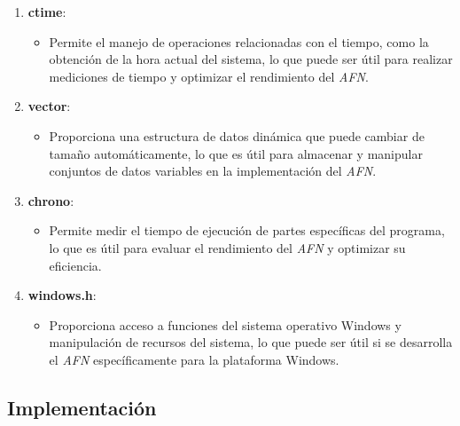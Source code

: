 \documentclass{article}
\begin{document}
\begin{enumerate}
            \item \textbf{ctime}:
            \begin{itemize}
                \item Permite el manejo de operaciones relacionadas con el tiempo, como la obtención de la hora actual del sistema,
                lo que puede ser útil para realizar mediciones de tiempo y optimizar el rendimiento del \textit{AFN}.
            \end{itemize}

            \item \textbf{vector}:
            \begin{itemize}
                \item Proporciona una estructura de datos dinámica que puede cambiar de tamaño automáticamente, lo que es útil para
                almacenar y manipular conjuntos de datos variables en la implementación del \textit{AFN}.
            \end{itemize}

            \item \textbf{chrono}:
            \begin{itemize}
                \item Permite medir el tiempo de ejecución de partes específicas del programa, lo que es útil para evaluar
                el rendimiento del \textit{AFN} y optimizar su eficiencia.
            \end{itemize}

            \item \textbf{windows.h}:
            \begin{itemize}
                \item Proporciona acceso a funciones del sistema operativo Windows y manipulación de recursos del sistema,
                lo que puede ser útil si se desarrolla el \textit{AFN} específicamente para la plataforma Windows.
            \end{itemize}
        \end{enumerate}

    \subsection{Implementación}
\end{document}
